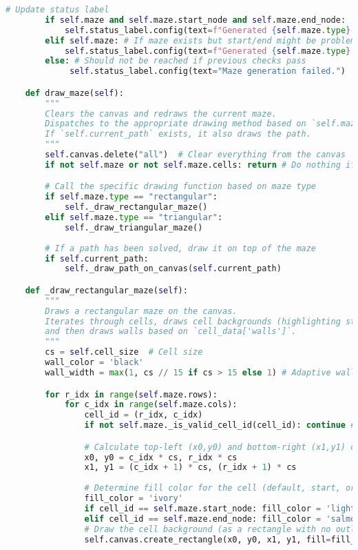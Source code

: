 \documentclass[UTF8]{report}
\theoremstyle{MyLineTheoremStyle} %
\theoremstyle{MyBlockTheoremStyle} %
\theoremstyle{MySubsubsectionStyle} %
\begin{document}
\begin{lstlisting}[language=Python, caption={迷宫生成与求解程序代码}]
        # Update status label
        if self.maze and self.maze.start_node and self.maze.end_node:
            self.status_label.config(text=f"Generated {self.maze.type} maze. Start: {self.maze.start_node}, End: {self.maze.end_node}")
        elif self.maze: # If maze exists but start/end might be problematic
            self.status_label.config(text=f"Generated {self.maze.type} maze. Start/End: {self.maze.start_node}/{self.maze.end_node} (may be invalid).")
        else: # Should not be reached if previous checks pass
             self.status_label.config(text="Maze generation failed.")

    def draw_maze(self):
        """
        Clears the canvas and redraws the current maze.
        Dispatches to the appropriate drawing method based on `self.maze.type`.
        If `self.current_path` exists, it also draws the path.
        """
        self.canvas.delete("all")  # Clear everything from the canvas
        if not self.maze or not self.maze.cells: return # Do nothing if no maze or cells

        # Call the specific drawing function based on maze type
        if self.maze.type == "rectangular":
            self._draw_rectangular_maze()
        elif self.maze.type == "triangular":
            self._draw_triangular_maze()
        
        # If a path has been solved, draw it on top of the maze
        if self.current_path:
            self._draw_path_on_canvas(self.current_path)

    def _draw_rectangular_maze(self):
        """
        Draws a rectangular maze on the canvas.
        Iterates through cells, draws cell backgrounds (highlighting start/end),
        and then draws walls based on `cell_data['walls']`.
        """
        cs = self.cell_size  # Cell size
        wall_color = 'black'
        wall_width = max(1, cs // 15 if cs > 15 else 1) # Adaptive wall width

        for r_idx in range(self.maze.rows):
            for c_idx in range(self.maze.cols):
                cell_id = (r_idx, c_idx)
                if not self.maze._is_valid_cell_id(cell_id): continue # Skip if somehow invalid

                # Calculate top-left (x0,y0) and bottom-right (x1,y1) coordinates of the cell
                x0, y0 = c_idx * cs, r_idx * cs
                x1, y1 = (c_idx + 1) * cs, (r_idx + 1) * cs
                
                # Determine fill color for the cell (default, start, or end)
                fill_color = 'ivory' 
                if cell_id == self.maze.start_node: fill_color = 'lightgreen'
                elif cell_id == self.maze.end_node: fill_color = 'salmon'
                # Draw the cell background (as a rectangle with no outline, walls will form the outline)
                self.canvas.create_rectangle(x0, y0, x1, y1, fill=fill_color, outline='')


\end{lstlisting}
\end{document}
